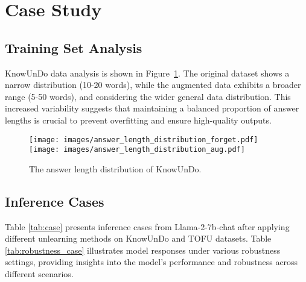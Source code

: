 \section{Case Study}
\subsection{Training Set Analysis}
KnowUnDo data analysis is shown in Figure~\ref{fig:answer_length}. 
The original dataset shows a narrow distribution (10-20 words), while the augmented data exhibits a broader range (5-50 words), and considering the wider general data distribution. 
This increased variability suggests that maintaining a balanced proportion of answer lengths is crucial to prevent overfitting and ensure high-quality outputs.
\begin{figure}[htbp]
  \centering
  \texttt{[image: images/answer\_length\_distribution\_forget.pdf]}
  \texttt{[image: images/answer\_length\_distribution\_aug.pdf]}
  \caption{The answer length distribution of KnowUnDo.}
  \label{fig:answer_length}
\end{figure}
\subsection{Inference Cases}
Table \ref{tab:case} presents inference cases from Llama-2-7b-chat after applying different unlearning methods on KnowUnDo and TOFU datasets.
Table \ref{tab:robustness_case} illustrates model responses under various robustness settings, providing insights into the model's performance and robustness across different scenarios.

